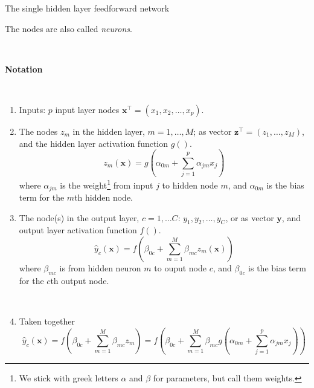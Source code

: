 \documentclass[
  10pt,
  ignorenonframetext,
  twocolumn]{beamer}
\providecommand{\tightlist}{%
  \setlength{\itemsep}{0pt}\setlength{\parskip}{0pt}}
\begin{document}
\begin{frame}
\begin{block}{The single hidden layer feedforward network}
\label{the-single-hidden-layer-feedforward-network}
\(~\)

The nodes are also called \emph{neurons}.

\(~\)

\textbf{Notation}

\(~\)

\begin{enumerate}
\tightlist
\item
  Inputs: \(p\) input layer nodes
  \({\boldsymbol{x}^\top} = (x_1, x_2, \ldots, x_p)\).
\item
  The nodes \(z_m\) in the hidden layer, \(m=1,\ldots, M\); as vector
  \({\boldsymbol z}^\top=(z_1, \ldots, z_M)\), and the hidden layer
  activation function \(g()\). \[
  z_m({\boldsymbol x})=g(\alpha_{0m}+\sum_{j=1}^p \alpha_{jm}x_{j})
  \] where \(\alpha_{jm}\) is the
  weight\footnote{We stick with greek letters $\alpha$ and $\beta$ for parameters, but call them weights.}
  from input \(j\) to hidden node \(m\), and \(\alpha_{0m}\) is the bias
  term for the \(m\)th hidden node.
\end{enumerate}
\end{block}
\end{frame}

\begin{frame}
\begin{enumerate}
\setcounter{enumi}{2}
\tightlist
\item
  The node(s) in the output layer, \(c=1,\ldots C\):
  \(y_1, y_2, \ldots, y_C\), or as vector \({\boldsymbol y}\), and
  output layer activation function \(f()\). \[
  \hat{y}_c({\boldsymbol x})=f(\beta_{0c}+\sum_{m=1}^M \beta_{mc}z_{m}({\boldsymbol x}))
  \] where \(\beta_{mc}\) is from hidden neuron \(m\) to ouput node
  \(c\), and \(\beta_{0c}\) is the bias term for the \(c\)th output
  node.
\end{enumerate}

\(~\)

\begin{enumerate}
\setcounter{enumi}{3}
\tightlist
\item
  Taken together \[
  \hat{y}_c({\boldsymbol x})=f(\beta_{0c}+\sum_{m=1}^M \beta_{mc}z_{m})=f(\beta_{0c}+\sum_{m=1}^M \beta_{mc}g(\alpha_{0m}+\sum_{j=1}^p \alpha_{jm}x_{j}))
  \]
\end{enumerate}
\end{frame}
\end{document}
